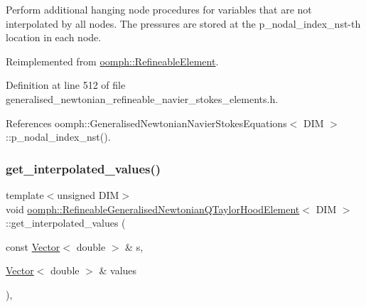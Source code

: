 Perform additional hanging node procedures for variables that are not interpolated by all nodes. The pressures are stored at the p\+\_\+nodal\+\_\+index\+\_\+nst-\/th location in each node. 



Reimplemented from \hyperlink{classoomph_1_1RefineableElement_a86ea01c485f7ff822dce74b884312ccb}{oomph\+::\+Refineable\+Element}.



Definition at line 512 of file generalised\+\_\+newtonian\+\_\+refineable\+\_\+navier\+\_\+stokes\+\_\+elements.\+h.



References oomph\+::\+Generalised\+Newtonian\+Navier\+Stokes\+Equations$<$ D\+I\+M $>$\+::p\+\_\+nodal\+\_\+index\+\_\+nst().

\mbox{\label{classoomph_1_1RefineableGeneralisedNewtonianQTaylorHoodElement_ab3951f1b651181efd1eac3221939b0ca}} 
\subsubsection{\texorpdfstring{get\+\_\+interpolated\+\_\+values()}{get\_interpolated\_values()}\hspace{0.1cm}{\footnotesize\ttfamily [1/2]}}
{\footnotesize\ttfamily template$<$unsigned D\+IM$>$ \\
void \hyperlink{classoomph_1_1RefineableGeneralisedNewtonianQTaylorHoodElement}{oomph\+::\+Refineable\+Generalised\+Newtonian\+Q\+Taylor\+Hood\+Element}$<$ D\+IM $>$\+::get\+\_\+interpolated\+\_\+values (\begin{DoxyParamCaption}\item[{const \hyperlink{classoomph_1_1Vector}{Vector}$<$ double $>$ \&}]{s,  }\item[{\hyperlink{classoomph_1_1Vector}{Vector}$<$ double $>$ \&}]{values }\end{DoxyParamCaption})\hspace{0.3cm}{\ttfamily [inline]}, {\ttfamily [virtual]}}



